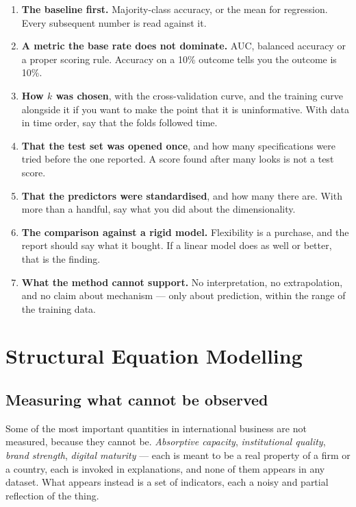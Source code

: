 \documentclass[
  letterpaper,
  10pt,
  twoside,
  openright,
  numbers=noenddot,
  chapterprefix=true]{scrbook}
\providecommand{\tightlist}{%
  \setlength{\itemsep}{0pt}\setlength{\parskip}{0pt}}
\begin{document}
\begin{enumerate}
\def\labelenumi{\arabic{enumi}.}
\tightlist
\item
  \textbf{The baseline first.} Majority-class accuracy, or the mean for
  regression. Every subsequent number is read against it.
\item
  \textbf{A metric the base rate does not dominate.} AUC, balanced
  accuracy or a proper scoring rule. Accuracy on a 10\% outcome tells
  you the outcome is 10\%.
\item
  \textbf{How \(k\) was chosen}, with the cross-validation curve, and
  the training curve alongside it if you want to make the point that it
  is uninformative. With data in time order, say that the folds followed
  time.
\item
  \textbf{That the test set was opened once}, and how many
  specifications were tried before the one reported. A score found after
  many looks is not a test score.
\item
  \textbf{That the predictors were standardised}, and how many there
  are. With more than a handful, say what you did about the
  dimensionality.
\item
  \textbf{The comparison against a rigid model.} Flexibility is a
  purchase, and the report should say what it bought. If a linear model
  does as well or better, that is the finding.
\item
  \textbf{What the method cannot support.} No interpretation, no
  extrapolation, and no claim about mechanism --- only about prediction,
  within the range of the training data.
\end{enumerate}


\chapter{Structural Equation
Modelling}\label{structural-equation-modelling}

\section{Measuring what cannot be
observed}\label{measuring-what-cannot-be-observed}

Some of the most important quantities in international business are not
measured, because they cannot be. \emph{Absorptive capacity},
\emph{institutional quality}, \emph{brand strength}, \emph{digital
maturity} --- each is meant to be a real property of a firm or a
country, each is invoked in explanations, and none of them appears in
any dataset. What appears instead is a set of indicators, each a noisy
and partial reflection of the thing.
\end{document}
